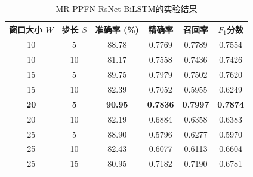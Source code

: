 \begin{table}[htbp]
    \vspace{0.4cm}

    \begin{subtable}{\linewidth}
        \centering
        \caption{MR-PPFN RsNet-BiLSTM的实验结果}
        \begin{tabular}{cc|cccc}
            \toprule
            窗口大小 $W$ & 步长 $S$ & 准确率 (\%) & 精确率 & 召回率 & $F_1$分数 \\
            \midrule
            10 & 5 & 88.78 & 0.7769 & 0.7789 & 0.7554 \\
            10 & 10 & 81.17 & 0.7558 & 0.7436 & 0.7426 \\
            15 & 5 & 89.75 & 0.7979 & 0.7502 & 0.7620 \\
            15 & 10 & 82.39 & 0.7052 & 0.5955 & 0.6249 \\
            \textbf{20} & \textbf{5} & \textbf{90.95} & \textbf{0.7836} & \textbf{0.7997} & \textbf{0.7874} \\
            20 & 10 & 82.19 & 0.6884 & 0.6358 & 0.6383 \\
            25 & 5 & 88.90 & 0.5796 & 0.6277 & 0.5970 \\
            25 & 10 & 82.43 & 0.6077 & 0.6113 & 0.6604 \\
            25 & 15 & 80.95 & 0.7182 & 0.7190 & 0.6781 \\
            \bottomrule
        \end{tabular}
        \label{tab:MR-PPFN RsNet-BiLSTM_window_step_performance}
    \end{subtable}
\end{table}
 
\begin{figure}[htbp]
	\centering
\end{figure}

